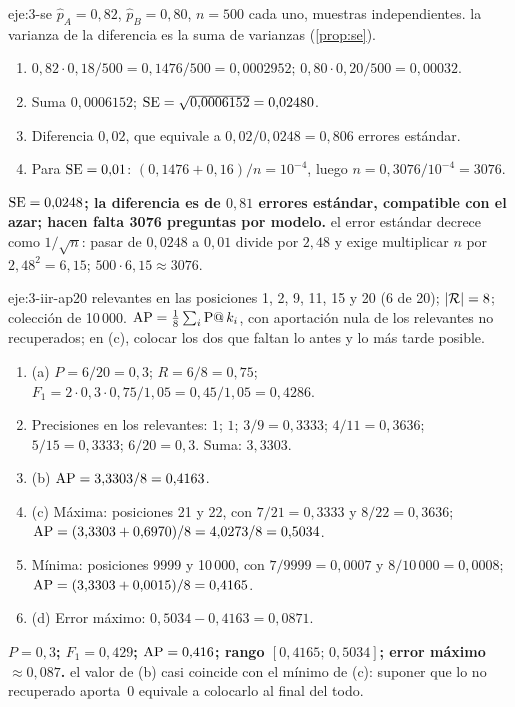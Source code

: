 \begin{solucion}{eje:3-se}
\datos $\hat p_A=0{,}82$, $\hat p_B=0{,}80$, $n=500$ cada uno, muestras independientes.
\planteamiento la varianza de la diferencia es la suma de varianzas (\cref{prop:se}).
\pasos
\begin{enumerate}[label=\arabic*.]
  \item $0{,}82\cdot 0{,}18/500=0{,}1476/500=0{,}0002952$; $0{,}80\cdot 0{,}20/500=0{,}00032$.
  \item Suma $0{,}0006152$; $\operatorname{SE}=\sqrt{0{,}0006152}=0{,}02480$.
  \item Diferencia $0{,}02$, que equivale a $0{,}02/0{,}0248=0{,}806$ errores estándar.
  \item Para $\operatorname{SE}=0{,}01$: $(0{,}1476+0{,}16)/n=10^{-4}$, luego $n=0{,}3076/10^{-4}=3076$.
\end{enumerate}
\resultado \textbf{$\operatorname{SE}=0{,}0248$; la diferencia es de $0{,}81$ errores estándar, compatible con el azar; hacen falta 3076 preguntas por modelo.}
\comprobacion el error estándar decrece como $1/\sqrt n$: pasar de $0{,}0248$ a $0{,}01$ divide por $2{,}48$ y exige multiplicar $n$ por $2{,}48^{2}=6{,}15$; $500\cdot 6{,}15\approx 3076$.
\end{solucion}

\begin{solucion}{eje:3-iir-ap20}
\datos relevantes en las posiciones 1, 2, 9, 11, 15 y 20 (6 de 20); $\lvert\mathcal{R}\rvert=8$; colección de 10\,000.
\planteamiento $\operatorname{AP}=\frac18\sum_i\operatorname{P@}k_i$, con aportación nula de los relevantes no recuperados; en (c), colocar los dos que faltan lo antes y lo más tarde posible.
\pasos
\begin{enumerate}[label=\arabic*.]
  \item (a) $P=6/20=0{,}3$; $R=6/8=0{,}75$; $F_1=2\cdot 0{,}3\cdot 0{,}75/1{,}05=0{,}45/1{,}05=0{,}4286$.
  \item Precisiones en los relevantes: $1$; $1$; $3/9=0{,}3333$; $4/11=0{,}3636$; $5/15=0{,}3333$; $6/20=0{,}3$. Suma: $3{,}3303$.
  \item (b) $\operatorname{AP}=3{,}3303/8=0{,}4163$.
  \item (c) Máxima: posiciones 21 y 22, con $7/21=0{,}3333$ y $8/22=0{,}3636$; $\operatorname{AP}=(3{,}3303+0{,}6970)/8=4{,}0273/8=0{,}5034$.
  \item Mínima: posiciones 9999 y 10\,000, con $7/9999=0{,}0007$ y $8/10\,000=0{,}0008$; $\operatorname{AP}=(3{,}3303+0{,}0015)/8=0{,}4165$.
  \item (d) Error máximo: $0{,}5034-0{,}4163=0{,}0871$.
\end{enumerate}
\resultado \textbf{$P=0{,}3$; $F_1=0{,}429$; $\operatorname{AP}=0{,}416$; rango $[0{,}4165;\,0{,}5034]$; error máximo $\approx 0{,}087$.}
\comprobacion el valor de (b) casi coincide con el mínimo de (c): suponer que lo no recuperado aporta~0 equivale a colocarlo al final del todo.
\end{solucion}

